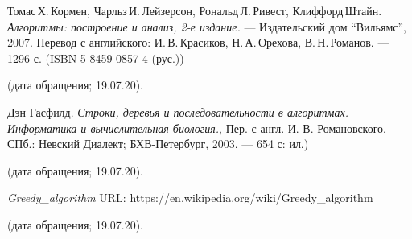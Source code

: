 \begin{thebibliography}{99}

Томас\,Х.\,Кормен, Чарльз\,И.\,Лейзерсон, Рональд\,Л.\,Ривест, Клиффорд\,Штайн.
{\itshape Алгоритмы: построение и анализ, 2-е издание.} --- Издательский дом \enquote{Вильямс}, 2007. Перевод с английского: И.\,В.\,Красиков, Н.\,А.\,Орехова, В.\,Н.\,Романов. --- 1296 с. (ISBN 5-8459-0857-4 (рус.))

(дата обращения; 19.07.20).

Дэн Гасфилд. 
{\itshape Строки, деревья и последовательности в алгоритмах. Информатика и вычислительная биология.}, Пер. с англ. И. В. Романовского. — СПб.: Невский Диалект; БХВ-Петербург, 2003. — 654 с: ил.)

(дата обращения; 19.07.20).

{\itshape Greedy\_algorithm}  URL: https://en.wikipedia.org/wiki/Greedy\_algorithm

(дата обращения; 19.07.20).

\end{thebibliography}
\pagebreak
